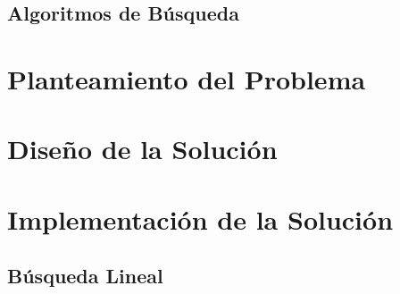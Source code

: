 \documentclass[12pt, fleqn]{article}                             %
\theoremstyle{break}                                            %
\begin{document}
    \subsection{Algoritmos de Búsqueda}




\clearpage
\section{Planteamiento del Problema}


\clearpage
\section{Diseño de la Solución}




\clearpage
\section{Implementación de la Solución}

    \clearpage
    \subsection{Búsqueda Lineal}

        





\clearpage
\end{document}
